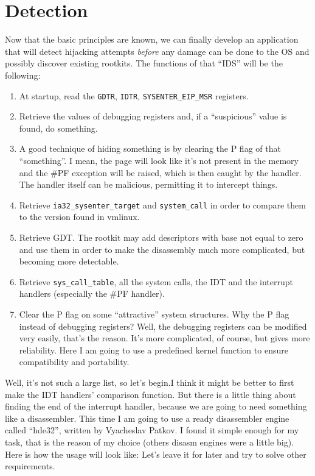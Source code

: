 \documentclass[12pt]{article}
\begin{document}
\section{Detection}
Now that the basic principles are known, we can finally develop an
application that will detect hijacking attempts \emph{before} any
damage can be done to the OS and possibly discover existing
rootkits. The functions of that ``IDS'' will be the following:
\begin{enumerate}
  \item At startup, read the \verb!GDTR!, \verb!IDTR!, \verb!SYSENTER_EIP_MSR!
    registers.
    
  \item Retrieve the values of debugging registers and, if
    a ``suspicious'' value is found, do something.
    
  \item A good technique of hiding something is by clearing the P flag
    of that ``something''. I mean, the page will look like it's not
    present in the memory and the \#PF exception will be raised, which
    is then caught by the handler. The handler itself can be
    malicious, permitting it to intercept things.

  \item Retrieve \verb!ia32_sysenter_target! and \verb!system_call! in
    order to compare them to the version found in vmlinux.

  \item Retrieve GDT. The rootkit may add descriptors with base not
    equal to zero and use them in order to make the disassembly much
    more complicated, but becoming more detectable.

  \item Retrieve \verb!sys_call_table!, all the system calls, the IDT
    and the interrupt handlers (especially the \#PF handler).

  \item Clear the P flag on some ``attractive'' system structures. Why
    the P flag instead of debugging registers? Well, the debugging
    registers can be modified very easily, that's the reason. It's
    more complicated, of course, but gives more reliability. Here I am
    going to use a predefined kernel function to ensure compatibility
    and portability.
\end{enumerate}
Well, it's not such a large list, so let's begin.I think it might be
better to first make the IDT handlers' comparison function. But there
is a little thing about finding the end of the interrupt handler,
because we are going to need something like a disassembler. This time
I am going to use a ready disassembler engine called ``hde32'',
written by Vyacheslav Patkov. I found it simple enough for my task,
that is the reason of my choice (others disasm engines were a little
big). Here is how the usage will look like: 
Let's leave it for later and try to solve other requirements.

%
\end{document}
